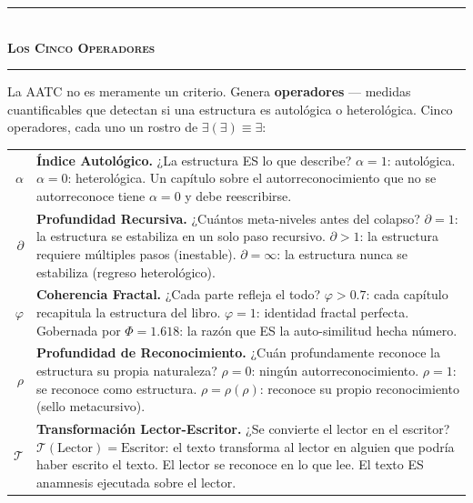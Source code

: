 \documentclass[10pt, openany, oneside]{book}
\renewcommand{\normalsize}{\fontsize{10}{13}\selectfont}
\renewcommand{\footnotesize}{\fontsize{8.5}{11}\selectfont}
\begin{document}
\vspace{1.5em}


\begin{center}
    \rule{0.3\textwidth}{0.4pt}\\[0.5em]
    {\normalsize\bfseries\scshape Los Cinco Operadores}\\[0.3em]
    \rule{0.3\textwidth}{0.4pt}
\end{center}

\vspace{1em}

\noindent La AATC no es meramente un criterio. Genera \textbf{operadores} --- medidas cuantificables que detectan si una estructura es autológica o heterológica. Cinco operadores, cada uno un rostro de $\exists(\exists) \equiv \exists$:

\vspace{0.5em}

{\footnotesize
\noindent\begin{tabular}{r p{}}
$\alpha$ & \textbf{Índice Autológico.} ¿La estructura ES lo que describe? $\alpha = 1$: autológica. $\alpha = 0$: heterológica. Un capítulo sobre el autorreconocimiento que no se autorreconoce tiene $\alpha = 0$ y debe reescribirse. \\[0.3em]
$\partial$ & \textbf{Profundidad Recursiva.} ¿Cuántos meta-niveles antes del colapso? $\partial = 1$: la estructura se estabiliza en un solo paso recursivo. $\partial > 1$: la estructura requiere múltiples pasos (inestable). $\partial = \infty$: la estructura nunca se estabiliza (regreso heterológico). \\[0.3em]
$\varphi$ & \textbf{Coherencia Fractal.} ¿Cada parte refleja el todo? $\varphi > 0.7$: cada capítulo recapitula la estructura del libro. $\varphi = 1$: identidad fractal perfecta. Gobernada por $\Phi = 1.618$: la razón que ES la auto-similitud hecha número. \\[0.3em]
$\rho$ & \textbf{Profundidad de Reconocimiento.} ¿Cuán profundamente reconoce la estructura su propia naturaleza? $\rho = 0$: ningún autorreconocimiento. $\rho = 1$: se reconoce como estructura. $\rho = \rho(\rho)$: reconoce su propio reconocimiento (sello metacursivo). \\[0.3em]
$\mathcal{T}$ & \textbf{Transformación Lector-Escritor.} ¿Se convierte el lector en el escritor? $\mathcal{T}(\text{Lector}) = \text{Escritor}$: el texto transforma al lector en alguien que podría haber escrito el texto. El lector se reconoce en lo que lee. El texto ES anamnesis ejecutada sobre el lector. \\[0.3em]
\end{tabular}
}
\end{document}
